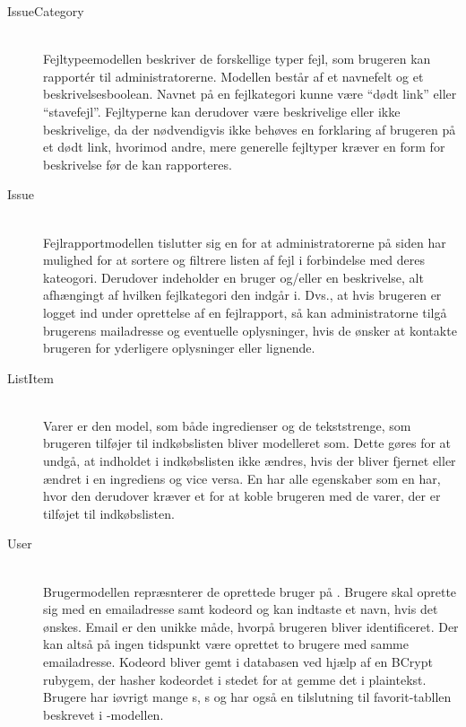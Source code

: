\begin{description}
  \item[IssueCategory] \hfill \\
    Fejltypeemodellen beskriver de forskellige typer fejl, som brugeren kan rapport\'{e}r til administratorerne. Modellen består af et navnefelt og et beskrivelsesboolean. Navnet på en fejlkategori kunne \fx være ``dødt link'' eller ``stavefejl''. Fejltyperne kan derudover være beskrivelige eller ikke beskrivelige, da der nødvendigvis ikke behøves en forklaring af brugeren på \fx et dødt link, hvorimod andre, mere generelle fejltyper kræver en form for beskrivelse før de kan rapporteres.

  \item[Issue] \hfill \\
    Fejlrapportmodellen tislutter sig en  for at administratorerne på siden har mulighed for at sortere og filtrere listen af fejl i forbindelse med deres kateogori. Derudover indeholder  en bruger og/eller en beskrivelse, alt afhængingt af hvilken fejlkategori den indgår i. Dvs., at hvis brugeren er logget ind under oprettelse af en fejlrapport, så kan administratorne tilgå brugerens mailadresse og eventuelle oplysninger, hvis de ønsker at kontakte brugeren for yderligere oplysninger eller lignende.

  \item[ListItem] \hfill \\
    Varer er den model, som både ingredienser og de tekststrenge, som brugeren tilføjer til indkøbslisten bliver modelleret som. Dette gøres for at undgå, at indholdet i indkøbslisten ikke ændres, hvis der bliver fjernet eller ændret i en ingrediens  og vice versa. En  har alle egenskaber som en  har, hvor den derudover kræver et  for at koble brugeren med de varer, der er tilføjet til indkøbslisten.

  \item[User] \hfill \\
    Brugermodellen repræsnterer de oprettede bruger på \Foodl{}. Brugere skal oprette sig med en emailadresse samt kodeord og kan indtaste et navn, hvis det ønskes. Email er den unikke måde, hvorpå brugeren bliver identificeret. Der kan altså på ingen tidspunkt være oprettet to brugere med samme emailadresse. Kodeord bliver gemt i databasen ved hjælp af en BCrypt rubygem, der hasher kodeordet i stedet for at gemme det i plaintekst. Brugere har iøvrigt mange s, s og har også en tilslutning til favorit-tabllen beskrevet i -modellen.

\end{description}
